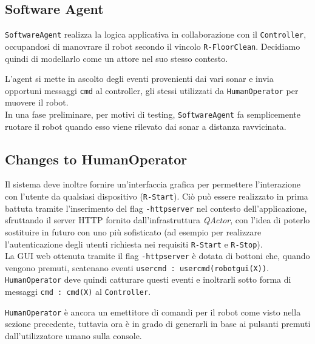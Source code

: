 \documentclass{../llncs}
\newcommand{\codescript}[1]{{\mbox{\small{\texttt{#1}}}}\xspace}
\newcommand{\code}[1]{{\color{blue}\small{\texttt{#1}}}}
\newcommand{\qa}{\textsf{\textit{QActor}}\xspace}
\newcommand{\labelssec}[1]{\label{ssec:#1}}
\begin{document}
\subsection{Software Agent}
\labelssec{swagPA}
\texttt{SoftwareAgent} realizza la logica applicativa in collaborazione con il \texttt{Controller}, occupandosi di manovrare il robot secondo il vincolo \code{R-FloorClean}. Decidiamo quindi di modellarlo come un attore nel suo stesso contesto.

L'agent si mette in ascolto degli eventi provenienti dai vari sonar e invia opportuni messaggi \codescript{cmd} al controller, gli stessi utilizzati da \texttt{HumanOperator} per muovere il robot.\\

In una fase preliminare, per motivi di testing, \texttt{SoftwareAgent} fa semplicemente ruotare il robot quando esso viene rilevato dai sonar a distanza ravvicinata.\\



\subsection{Changes to HumanOperator}
\labelssec{humanOpPA}
Il sistema deve inoltre fornire un'interfaccia grafica per permettere l'interazione con l'utente da qualsiasi dispositivo (\code{R-Start}). Ciò può essere realizzato in prima battuta tramite l'inserimento del flag \codescript{-httpserver} nel contesto dell'applicazione, sfruttando il server HTTP fornito dall'infrastruttura \qa, con l'idea di poterlo sostituire in futuro con uno più sofisticato (ad esempio per realizzare l'autenticazione degli utenti richiesta nei requisiti \code{R-Start} e \code{R-Stop}).\\



La GUI web ottenuta tramite il flag \codescript{-httpserver} è dotata di bottoni che, quando vengono premuti, scatenano eventi \codescript{usercmd : usercmd(robotgui(X))}. \texttt{HumanOperator} deve quindi catturare questi eventi e inoltrarli sotto forma di messaggi \codescript{cmd : cmd(X)} al \texttt{Controller}.

\texttt{HumanOperator} è ancora un emettitore di comandi per il robot come visto nella sezione precedente, tuttavia ora è in grado di generarli in base ai pulsanti premuti dall'utilizzatore umano sulla console.\\
\end{document}
